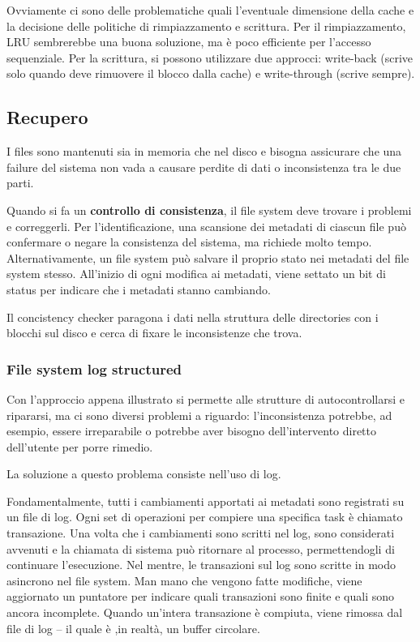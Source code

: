 \documentclass[a4]{article}
\begin{document}
Ovviamente ci sono delle problematiche quali l'eventuale dimensione della cache e la decisione delle politiche di rimpiazzamento e scrittura. Per il rimpiazzamento, LRU sembrerebbe una buona soluzione, ma è poco efficiente per l'accesso sequenziale. Per la scrittura, si possono utilizzare due approcci: write-back (scrive solo quando deve rimuovere il blocco dalla cache) e write-through (scrive sempre).

\subsection{Recupero}
I files sono mantenuti sia in memoria che nel disco e bisogna assicurare che una failure del sistema non vada a causare perdite di dati o inconsistenza tra le due parti.

Quando si fa un \textbf{controllo di consistenza}, il file system deve trovare i problemi e correggerli. Per l'identificazione, una scansione dei metadati di ciascun file può confermare o negare la consistenza del sistema, ma richiede molto tempo. Alternativamente, un file system può salvare il proprio stato nei metadati del file system stesso. All'inizio di ogni modifica ai metadati, viene settato un bit di status per indicare che i metadati stanno cambiando.

Il concistency checker paragona i dati nella struttura delle directories con i blocchi sul disco e cerca di fixare le inconsistenze che trova.

\subsubsection{File system log structured}
Con l'approccio appena illustrato si permette alle strutture di autocontrollarsi e ripararsi, ma ci sono diversi problemi a riguardo: l'inconsistenza potrebbe, ad esempio, essere irreparabile o potrebbe aver bisogno dell'intervento diretto dell'utente per porre rimedio.

La soluzione a questo problema consiste nell'uso di log.

Fondamentalmente, tutti i cambiamenti apportati ai metadati sono registrati su un file di log. Ogni set di operazioni per compiere una specifica task è chiamato transazione. Una volta che i cambiamenti sono scritti nel log, sono considerati avvenuti e la chiamata di sistema può ritornare al processo, permettendogli di continuare l'esecuzione. Nel mentre, le transazioni sul log sono scritte in modo asincrono nel file system. Man mano che vengono fatte modifiche, viene aggiornato un puntatore per indicare quali transazioni sono finite e quali sono ancora incomplete. Quando un'intera transazione è compiuta, viene rimossa dal file di log -- il quale è ,in realtà, un buffer circolare.
\end{document}
